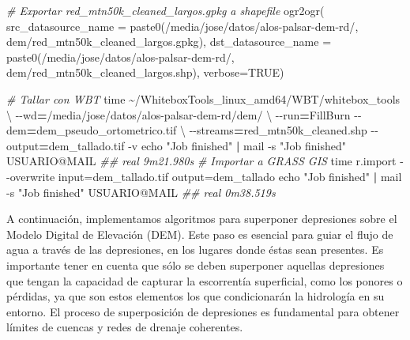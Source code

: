 \documentclass[spanish]{article}
\newenvironment{Shaded}{\begin{snugshade}}{\end{snugshade}}
\newcommand{\AttributeTok}[1]{\textcolor[rgb]{0.77,0.63,0.00}{#1}}
\newcommand{\BuiltInTok}[1]{#1}
\newcommand{\CommentTok}[1]{\textcolor[rgb]{0.56,0.35,0.01}{\textit{#1}}}
\newcommand{\ConstantTok}[1]{\textcolor[rgb]{0.00,0.00,0.00}{#1}}
\newcommand{\DataTypeTok}[1]{\textcolor[rgb]{0.13,0.29,0.53}{#1}}
\newcommand{\ExtensionTok}[1]{#1}
\newcommand{\FunctionTok}[1]{\textcolor[rgb]{0.00,0.00,0.00}{#1}}
\newcommand{\KeywordTok}[1]{\textcolor[rgb]{0.13,0.29,0.53}{\textbf{#1}}}
\newcommand{\NormalTok}[1]{#1}
\newcommand{\OperatorTok}[1]{\textcolor[rgb]{0.81,0.36,0.00}{\textbf{#1}}}
\newcommand{\StringTok}[1]{\textcolor[rgb]{0.31,0.60,0.02}{#1}}
\begin{document}
\begin{Shaded}
\begin{Highlighting}[]
\CommentTok{\# Exportar red\_mtn50k\_cleaned\_largos.gpkg a shapefile}
\FunctionTok{ogr2ogr}\NormalTok{(}
  \AttributeTok{src\_datasource\_name =} \FunctionTok{paste0}\NormalTok{(}\StringTok{\textquotesingle{}/media/jose/datos/alos{-}palsar{-}dem{-}rd/\textquotesingle{}}\NormalTok{,}
                               \StringTok{\textquotesingle{}dem/red\_mtn50k\_cleaned\_largos.gpkg\textquotesingle{}}\NormalTok{),}
  \AttributeTok{dst\_datasource\_name =} \FunctionTok{paste0}\NormalTok{(}\StringTok{\textquotesingle{}/media/jose/datos/alos{-}palsar{-}dem{-}rd/\textquotesingle{}}\NormalTok{,}
                               \StringTok{\textquotesingle{}dem/red\_mtn50k\_cleaned\_largos.shp\textquotesingle{}}\NormalTok{),}
  \AttributeTok{verbose=}\ConstantTok{TRUE}\NormalTok{)}
\end{Highlighting}
\end{Shaded}

\begin{Shaded}
\begin{Highlighting}[]
\CommentTok{\# Tallar con WBT}
\BuiltInTok{time}\NormalTok{ \textasciitilde{}/WhiteboxTools\_linux\_amd64/WBT/whitebox\_tools }\DataTypeTok{\textbackslash{}}
  \AttributeTok{{-}{-}wd}\OperatorTok{=}\StringTok{\textquotesingle{}/media/jose/datos/alos{-}palsar{-}dem{-}rd/dem/\textquotesingle{}} \DataTypeTok{\textbackslash{}}
  \AttributeTok{{-}{-}run}\OperatorTok{=}\NormalTok{FillBurn }\AttributeTok{{-}{-}dem}\OperatorTok{=}\StringTok{\textquotesingle{}dem\_pseudo\_ortometrico.tif\textquotesingle{}} \DataTypeTok{\textbackslash{}}
  \AttributeTok{{-}{-}streams}\OperatorTok{=}\NormalTok{red\_mtn50k\_cleaned.shp }\AttributeTok{{-}{-}output}\OperatorTok{=}\StringTok{\textquotesingle{}dem\_tallado.tif\textquotesingle{}} \AttributeTok{{-}v}
\BuiltInTok{echo} \StringTok{"Job finished"} \KeywordTok{|} \ExtensionTok{mail} \AttributeTok{{-}s} \StringTok{"Job finished"}\NormalTok{ USUARIO@MAIL}
\CommentTok{\#\# real 9m21.980s}
\CommentTok{\# Importar a GRASS GIS}
\BuiltInTok{time}\NormalTok{ r.import }\AttributeTok{{-}{-}overwrite}\NormalTok{ input=dem\_tallado.tif output=dem\_tallado}
\BuiltInTok{echo} \StringTok{"Job finished"} \KeywordTok{|} \ExtensionTok{mail} \AttributeTok{{-}s} \StringTok{"Job finished"}\NormalTok{ USUARIO@MAIL}
\CommentTok{\#\# real 0m38.519s}
\end{Highlighting}
\end{Shaded}

A continuación, implementamos algoritmos para superponer depresiones
sobre el Modelo Digital de Elevación (DEM). Este paso es esencial para
guiar el flujo de agua a través de las depresiones, en los lugares donde
éstas sean presentes. Es importante tener en cuenta que sólo se deben
superponer aquellas depresiones que tengan la capacidad de capturar la
escorrentía superficial, como los ponores o pérdidas, ya que son estos
elementos los que condicionarán la hidrología en su entorno. El proceso
de superposición de depresiones es fundamental para obtener límites de
cuencas y redes de drenaje coherentes.
\end{document}
